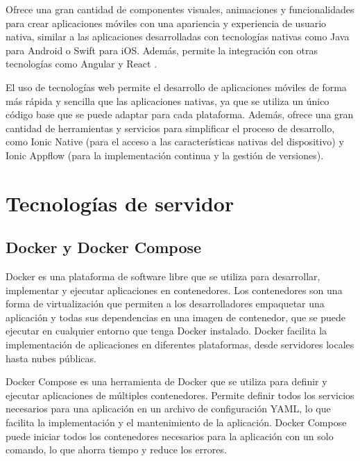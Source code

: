 Ofrece una gran cantidad de componentes visuales, animaciones y funcionalidades para crear aplicaciones móviles con una apariencia y experiencia de usuario nativa, similar a las aplicaciones desarrolladas con tecnologías nativas como Java para Android o Swift para iOS. Además, permite la integración con otras tecnologías como Angular \cite{WEBSITE:angular} y React \cite{WEBSITE:react}.

El uso de tecnologías web permite el desarrollo de aplicaciones móviles de forma más rápida y sencilla que las aplicaciones nativas, ya que se utiliza un único código base que se puede adaptar para cada plataforma. Además, ofrece una gran cantidad de herramientas y servicios para simplificar el proceso de desarrollo, como Ionic Native (para el acceso a las características nativas del dispositivo) y Ionic Appflow (para la implementación continua y la gestión de versiones).


\section{Tecnologías de servidor}
\label{sec:servidor}

\subsection{Docker y Docker Compose}
\label{subsec:docker}

Docker \cite{WEBSITE:docker} es una plataforma de software libre que se utiliza para desarrollar, implementar y ejecutar aplicaciones en contenedores. Los contenedores son una forma de virtualización que permiten a los desarrolladores empaquetar una aplicación y todas sus dependencias en una imagen de contenedor, que se puede ejecutar en cualquier entorno que tenga Docker instalado. Docker facilita la implementación de aplicaciones en diferentes plataformas, desde servidores locales hasta nubes públicas.

Docker Compose \cite{WEBSITE:docker-compose} es una herramienta de Docker que se utiliza para definir y ejecutar aplicaciones de múltiples contenedores. Permite definir todos los servicios necesarios para una aplicación en un archivo de configuración YAML, lo que facilita la implementación y el mantenimiento de la aplicación. Docker Compose puede iniciar todos los contenedores necesarios para la aplicación con un solo comando, lo que ahorra tiempo y reduce los errores.

